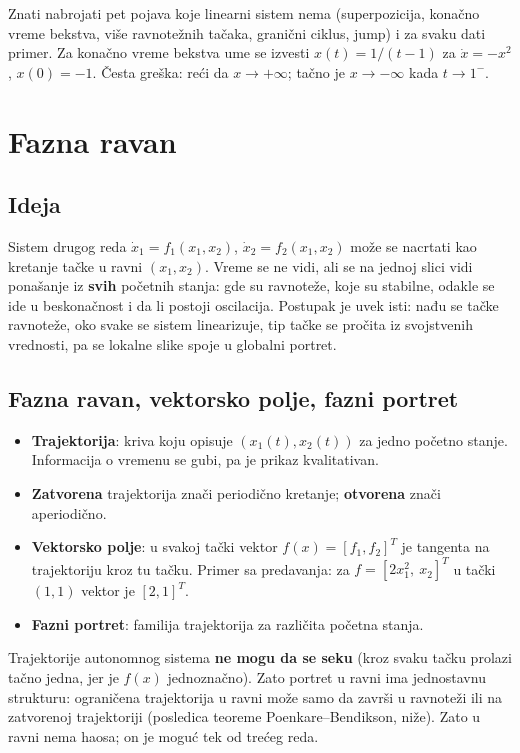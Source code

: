 \documentclass[11pt,a4paper,parskip=half,headsepline,numbers=noenddot]{scrartcl}
\begin{document}
\begin{ispit}
Znati nabrojati pet pojava koje linearni sistem nema (superpozicija, konačno vreme bekstva, više ravnotežnih tačaka, granični ciklus, jump) i za svaku dati primer. Za konačno vreme bekstva ume se izvesti \(x(t) = 1/(t-1)\) za \(\dot x = -x^2\), \(x(0) = -1\). Česta greška: reći da \(x \to +\infty\); tačno je \(x \to -\infty\) kada \(t \to 1^-\).
\end{ispit}

\section{Fazna ravan}

\subsection{Ideja}

Sistem drugog reda \(\dot x_1 = f_1(x_1, x_2)\), \(\dot x_2 = f_2(x_1, x_2)\) može se nacrtati kao kretanje tačke u ravni \((x_1, x_2)\). Vreme se ne vidi, ali se na jednoj slici vidi ponašanje iz \textbf{svih} početnih stanja: gde su ravnoteže, koje su stabilne, odakle se ide u beskonačnost i da li postoji oscilacija. Postupak je uvek isti: nađu se tačke ravnoteže, oko svake se sistem linearizuje, tip tačke se pročita iz svojstvenih vrednosti, pa se lokalne slike spoje u globalni portret.

\subsection{Fazna ravan, vektorsko polje, fazni portret}

\begin{itemize}
\item \textbf{Trajektorija}: kriva koju opisuje \((x_1(t), x_2(t))\) za jedno početno stanje. Informacija o vremenu se gubi, pa je prikaz kvalitativan.
\item \textbf{Zatvorena} trajektorija znači periodično kretanje; \textbf{otvorena} znači aperiodično.
\item \textbf{Vektorsko polje}: u svakoj tački vektor \(f(x) = [f_1, f_2]^T\) je tangenta na trajektoriju kroz tu tačku. Primer sa predavanja: za \(f = [2x_1^2,\ x_2]^T\) u tački \((1, 1)\) vektor je \([2, 1]^T\).
\item \textbf{Fazni portret}: familija trajektorija za različita početna stanja.
\end{itemize}

Trajektorije autonomnog sistema \textbf{ne mogu da se seku} (kroz svaku tačku prolazi tačno jedna, jer je \(f(x)\) jednoznačno). Zato portret u ravni ima jednostavnu strukturu: ograničena trajektorija u ravni može samo da završi u ravnoteži ili na zatvorenoj trajektoriji (posledica teoreme Poenkare--Bendikson, niže). Zato u ravni nema haosa; on je moguć tek od trećeg reda.
\end{document}
